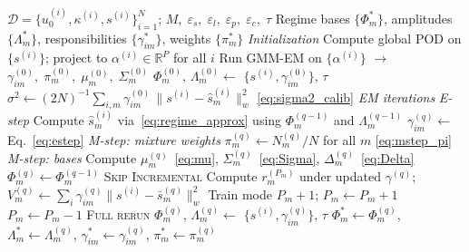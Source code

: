\documentclass{article}
\begin{document}
\begin{algorithm}[t]
\caption{TEMPO --- Offline Phase}
\label{alg:tempo}
\begin{algorithmic}[1]
\Require $\mathcal{D} = \{u_0^{(i)}, \kappa^{(i)}, s^{(i)}\}_{i=1}^N$;\;
  $M,\;\varepsilon_s,\;\varepsilon_l,\;\varepsilon_p,\;\varepsilon_c,\;\tau$
\Ensure Regime bases $\{\Phi_m^*\}$,\;
  amplitudes $\{\Lambda_m^*\}$,\;
  responsibilities $\{\gamma_{im}^*\}$,\;
  weights $\{\pi_m^*\}$
%
\Statex \textit{Initialization}
\State Compute global POD on $\{s^{(i)}\}$;
  project to $\alpha^{(i)} \in \mathbb{R}^P$ for all $i$
\State Run GMM-EM on $\{\alpha^{(i)}\}$ $\to$
  $\gamma_{im}^{(0)},\;\pi_m^{(0)},\;\mu_m^{(0)},\;\Sigma_m^{(0)}$
  \State $\Phi_m^{(0)},\,\Lambda_m^{(0)} \leftarrow$
    {$\{s^{(i)},\gamma_{im}^{(0)}\},\,\tau$}
    \hfill{}
\EndFor
\State $\sigma^2 \leftarrow (2N)^{-1}\!\sum_{i,m}
  \gamma_{im}^{(0)}\,\|s^{(i)}{-}\hat{s}_m^{(i)}\|_w^2$
  \hfill\eqref{eq:sigma2_calib}
%
\Statex \textit{EM iterations}
\Repeat
  \Statex \quad\textit{E-step}
    \State Compute $\hat{s}_m^{(i)}$ via~\eqref{eq:regime_approx}
      using $\Phi_m^{(q-1)}$ and $\Lambda_m^{(q-1)}$
    \State $\gamma_{im}^{(q)} \leftarrow$ Eq.~\eqref{eq:estep}
  \EndFor
  \Statex \quad\textit{M-step: mixture weights}
  \State $\pi_m^{(q)} \leftarrow N_m^{(q)}/N$
    for all $m$ \hfill\eqref{eq:mstep_pi}
  \Statex \quad\textit{M-step: bases}
    \State Compute $\mu_m^{(q)}$~\eqref{eq:mu},\;
      $\Sigma_m^{(q)}$~\eqref{eq:Sigma},\;
      $\Delta_m^{(q)}$~\eqref{eq:Delta}
      \State $\Phi_m^{(q)} \leftarrow \Phi_m^{(q-1)}$
        \hfill \textsc{Skip}
      \hfill \textsc{Incremental}
      \State Compute $r_m^{(P_m)}$ under updated $\gamma^{(q)}$;\;
        $V_m^{(q)} \leftarrow \sum_i\gamma_{im}^{(q)}\|s^{(i)}{-}\bar{s}_m^{(q)}\|_w^2$
        \State Train mode $P_m{+}1$;\; $P_m \leftarrow P_m + 1$
      \EndIf
        \State $P_m \leftarrow P_m - 1$
      \EndIf
    \Else
      \hfill \textsc{Full rerun}
      \State $\Phi_m^{(q)},\,\Lambda_m^{(q)} \leftarrow$
        {$\{s^{(i)},\gamma_{im}^{(q)}\},\,\tau$}
    \EndIf
  \EndFor
{}
\State \Return $\Phi_m^* \!\leftarrow\! \Phi_m^{(q)}$,\;
  $\Lambda_m^* \!\leftarrow\! \Lambda_m^{(q)}$,\;
  $\gamma_{im}^* \!\leftarrow\! \gamma_{im}^{(q)}$,\;
  $\pi_m^* \!\leftarrow\! \pi_m^{(q)}$
\end{algorithmic}
\end{algorithm}
\end{document}
